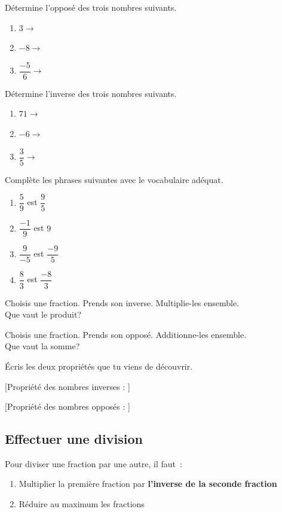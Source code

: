 \documentclass[../../syllabus_2.tex]{subfiles}
\begin{document}
\exemples Détermine l'opposé des trois nombres suivants.
\begin{enumerate} [cols=3]
  \item $3 \rightarrow$
  \item $-8 \rightarrow$
  \item $\dfrac{-5}{6} \rightarrow$
\end{enumerate}

\exemples Détermine l'inverse des trois nombres suivants.
\begin{enumerate} [cols=3]
  \item $71 \rightarrow$
  \item $-6 \rightarrow$
  \item $\dfrac{3}{5} \rightarrow$
\end{enumerate}

\newpage
\begin{exercise}
  Complète les phrases suivantes avec le vocabulaire adéquat.
    \begin{enumerate} [itemsep=1cm] 
    \item $\dfrac{5}{9}$ est \dotfill$\dfrac{9}{5}$
    \item $\dfrac{-1}{9}$ est \dotfill$9$
    \item $\dfrac{9}{-5}$ est \dotfill$\dfrac{-9}{5}$
    \item $\dfrac{8}{3}$ est \dotfill$\dfrac{-8}{3}$ 
  \end{enumerate}
  \vspace{1cm}
\end{exercise}

\begin{exercise}
  Choisis une fraction. Prends son inverse. Multiplie-les ensemble.\\
  Que vaut le produit?
  \vfill
\end{exercise}

\begin{exercise}
  Choisis une fraction. Prends son opposé. Additionne-les ensemble.\\
  Que vaut la somme? 
  \vfill
\end{exercise}

Écris les deux propriétés que tu viens de découvrir. 

[Propriété des nombres inverses : ]

[Propriété des nombres opposés : ]

\newpage

\subsection{Effectuer une division}
Pour diviser une fraction par une autre, il faut~:
\begin{enumerate}
 \item Multiplier la première fraction par \textbf{l'inverse de la seconde fraction} 
 \item Réduire au maximum les fractions
  
\end{enumerate}
\end{document}
